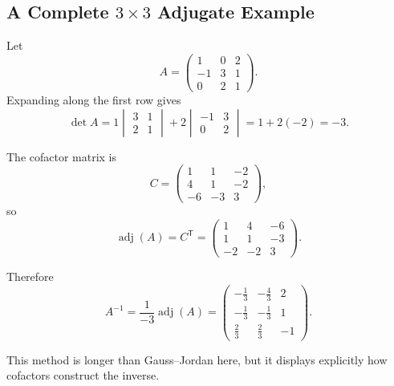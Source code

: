 \subsection{A Complete $3\times3$ Adjugate Example}

Let
\[
A=\begin{pmatrix}
1&0&2\\-1&3&1\\0&2&1
\end{pmatrix}.
\]
Expanding along the first row gives
\[
\det A=1\begin{vmatrix}3&1\\2&1\end{vmatrix}
+2\begin{vmatrix}-1&3\\0&2\end{vmatrix}
=1+2(-2)=-3.
\]

\begin{derivationbox}
The cofactor matrix is
\[
C=\begin{pmatrix}
1&1&-2\\
4&1&-2\\
-6&-3&3
\end{pmatrix},
\]
so
\[
\operatorname{adj}(A)=C^{\mathsf T}
=\begin{pmatrix}
1&4&-6\\
1&1&-3\\
-2&-2&3
\end{pmatrix}.
\]
\end{derivationbox}

Therefore
\[
A^{-1}=\frac1{-3}\operatorname{adj}(A)
=\begin{pmatrix}
-\frac13&-\frac43&2\\
-\frac13&-\frac13&1\\
\frac23&\frac23&-1
\end{pmatrix}.
\]

This method is longer than Gauss--Jordan here, but it displays explicitly how cofactors construct the inverse.
